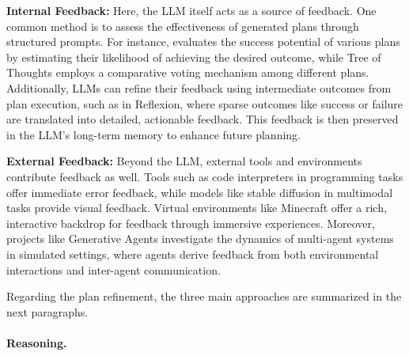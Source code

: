 \textbf{Internal Feedback:} Here, the LLM itself acts as a source of feedback.
One common method is to assess the effectiveness of generated plans through structured prompts.
For instance, \textcite{hao2023reasoning} evaluates the success potential of various plans by estimating their likelihood of achieving the desired outcome, while Tree of Thoughts employs a comparative voting mechanism among different plans.
Additionally, LLMs can refine their feedback using intermediate outcomes from plan execution, such as in Reflexion, where sparse outcomes like success or failure are translated into detailed, actionable feedback.
This feedback is then preserved in the LLM’s long-term memory to enhance future planning.

\textbf{External Feedback:} Beyond the LLM, external tools and environments contribute feedback as well.
Tools such as code interpreters in programming tasks offer immediate error feedback, while models like stable diffusion in multimodal tasks provide visual feedback.
Virtual environments like Minecraft offer a rich, interactive backdrop for feedback through immersive experiences.
Moreover, projects like Generative Agents investigate the dynamics of multi-agent systems in simulated settings, where agents derive feedback from both environmental interactions and inter-agent communication.

Regarding the plan refinement, the three main approaches are summarized in the next paragraphs.

\paragraph{Reasoning.}
\label{par:reasoning}

